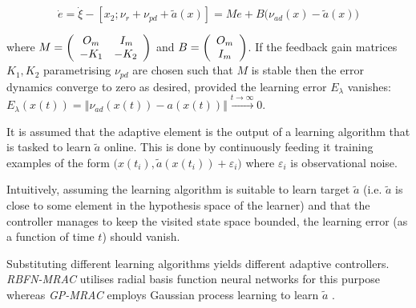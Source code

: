 \documentclass{article} %
\newcommand{\jcom}[1]{\textcolor{cyan} {\emph{Jan says: #1}}}
\theoremstyle{definition}
\theoremstyle{remark}
\newcommand{\norm}[1]{\left\Vert#1\right\Vert}
\begin{document}
\begin{equation}\label{eq:errordynmrac}
	\dot e = \dot \xi - [x_2; \nu_r + \nu_{pd}+ \tilde a(x) ] = M e + B \bigl(\nu_{ad}(x) -  \tilde a(x)\bigr)
\end{equation}


where $M = \left(\begin{array}[h]{cc}
			O_m &  \, I_{m}\\
			-K_1 & -K_2 
					\end{array}\right)$ and $B = \left(\begin{array}[h]{c}
			O_m \\ I_m
					\end{array}\right)$.
If the feedback gain matrices $K_1,K_2$ parametrising $\nu_{pd}$ are chosen such that $M$ is stable then the error dynamics converge to zero as desired, provided the learning error $E_\lambda$ vanishes: $E_\lambda (x(t)) = \norm{\nu_{ad}(x(t)) -  a(x(t))} \stackrel{t \to \infty} {\longrightarrow} 0$. 

It is assumed that the adaptive element is the output of a learning algorithm that is tasked to learn $\tilde a$ online. This is done by continuously feeding it training examples of the form $\bigl(x(t_i), \tilde a(x(t_i)) + \varepsilon_i\bigr)$ where $\varepsilon_i$ is observational noise.  

Intuitively, assuming the learning algorithm is suitable to learn target $\tilde a$ (i.e. $\tilde a$ is close to some element in the hypothesis space \cite{mitchellbook:97} of the learner) and that the controller manages to keep the visited state space bounded, the learning error (as a function of time $t$) should vanish.

Substituting different learning algorithms yields different adaptive controllers. \textit{RBFN-MRAC} \cite{Kim1998} utilises radial basis function neural networks for this purpose whereas \textit{GP-MRAC} 
employs Gaussian process learning \cite{GPbook:2006} to learn $\tilde a$ \cite{Chowdhary2013,ChowdharyCDC2013}. 

\end{document}
